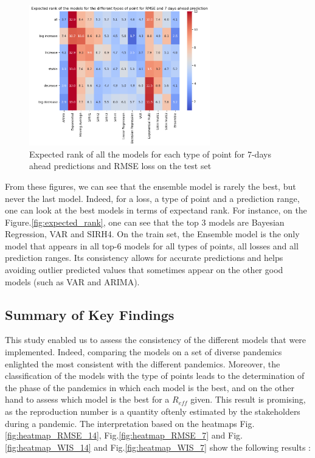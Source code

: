 \begin{figure}
    \centering
    \includegraphics[width=0.7\textwidth]{figures/heatmap_esb_7.png}
    \caption{Expected rank of all the models for each type of point for 7-days ahead predictions and RMSE loss on the test set}
    \label{fig:heatmap_esb_7}
\end{figure}

From these figures, we can see that the ensemble model is rarely the best, but never the last model. 
Indeed, for a loss, a type of point and a prediction range, one can look at the best models in terms of expectand rank.
For instance, on the Figure.\ref{fig:expected_rank}, one can see that the top 3 models are Bayesian Regression, VAR and SIRH4. 
On the train set, the Ensemble model is the only model that appears in all top-6 models for all types of points, all losses and all prediction ranges.
Its consistency allows for accurate predictions and helps avoiding outlier predicted values that sometimes appear on the other good models (such as VAR and ARIMA). 



\subsection{Summary of Key Findings}

This study enabled us to assess the consistency of the different models that were implemented. 
Indeed, comparing the models on a set of diverse pandemics enlighted the most consistent with the different pandemics.
Moreover, the classification of the models with the type of points leads to the determination of the phase of the pandemics in which each model is the best, and on the other hand to assess which model is the best for a $R_{eff}$ given. 
This result is promising, as the reproduction number is a quantity oftenly estimated by the stakeholders during a pandemic. 
The interpretation based on the heatmaps Fig.\ref{fig:heatmap_RMSE_14}, Fig.\ref{fig:heatmap_RMSE_7} and Fig.\ref{fig:heatmap_WIS_14} and Fig.\ref{fig:heatmap_WIS_7} show the following results : \\



